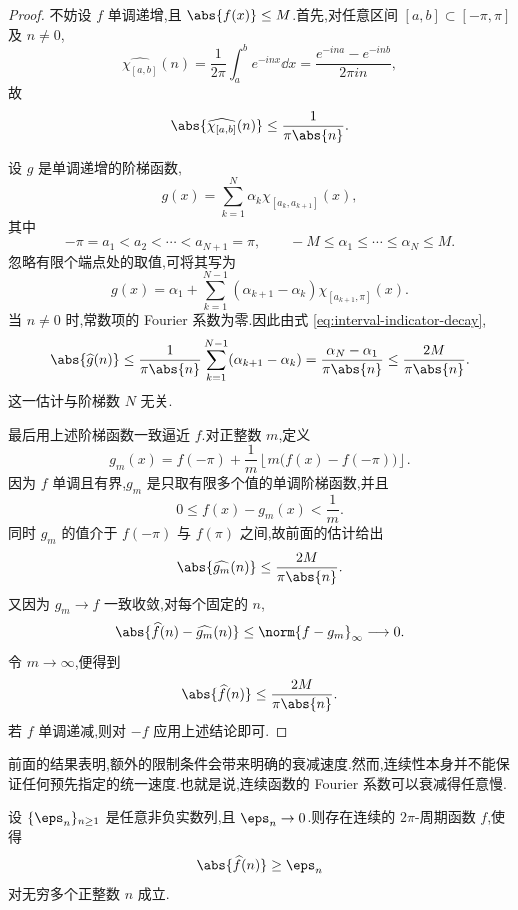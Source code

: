 \begin{proof}
不妨设 $f$ 单调递增,且 $\abs{f(x)}\leq M$.首先,对任意区间 $[a,b]\subset[-\pi,\pi]$ 及 $n\neq0$,
\[
\widehat{\chi_{[a,b]}}(n)
=\frac1{2\pi}\int_a^b e^{-inx}\dd x
=\frac{e^{-ina}-e^{-inb}}{2\pi in},
\]
故
\begin{equation}\label{eq:interval-indicator-decay}
\abs{\widehat{\chi_{[a,b]}}(n)}
\leq\frac1{\pi\abs{n}}.
\end{equation}

设 $g$ 是单调递增的阶梯函数,
\[
g(x)=\sum_{k=1}^{N}\alpha_k\chi_{[a_k,a_{k+1}]}(x),
\]
其中
\[
-\pi=a_1<a_2<\cdots<a_{N+1}=\pi,
\qquad
-M\leq\alpha_1\leq\cdots\leq\alpha_N\leq M.
\]
忽略有限个端点处的取值,可将其写为
\[
g(x)=\alpha_1+
\sum_{k=1}^{N-1}(\alpha_{k+1}-\alpha_k)
\chi_{[a_{k+1},\pi]}(x).
\]
当 $n\neq0$ 时,常数项的 Fourier 系数为零.因此由式 \eqref{eq:interval-indicator-decay},
\[\abs{\widehat g(n)}
\leq\frac1{\pi\abs{n}}
\sum_{k=1}^{N-1}(\alpha_{k+1}-\alpha_k)=\frac{\alpha_N-\alpha_1}{\pi\abs{n}}
\leq\frac{2M}{\pi\abs{n}}.\]
这一估计与阶梯数 $N$ 无关.

最后用上述阶梯函数一致逼近 $f$.对正整数 $m$,定义
\[
g_m(x)=f(-\pi)+\frac1m
\left\lfloor m\bigl(f(x)-f(-\pi)\bigr)\right\rfloor.
\]
因为 $f$ 单调且有界,$g_m$ 是只取有限多个值的单调阶梯函数,并且
\[
0\leq f(x)-g_m(x)<\frac1m.
\]
同时 $g_m$ 的值介于 $f(-\pi)$ 与 $f(\pi)$ 之间,故前面的估计给出
\[
\abs{\widehat{g_m}(n)}\leq\frac{2M}{\pi\abs{n}}.
\]
又因为 $g_m\to f$ 一致收敛,对每个固定的 $n$,
\[
\abs{\widehat f(n)-\widehat{g_m}(n)}
\leq\norm{f-g_m}_{\infty}\longrightarrow0.
\]
令 $m\to\infty$,便得到
\[
\abs{\widehat f(n)}\leq\frac{2M}{\pi\abs{n}}.
\]
若 $f$ 单调递减,则对 $-f$ 应用上述结论即可.
\end{proof}



前面的结果表明,额外的限制条件会带来明确的衰减速度.然而,连续性本身并不能保证任何预先指定的统一速度.也就是说,连续函数的 Fourier 系数可以衰减得任意慢.

\begin{proposition}
设 $\{\eps_n\}_{n\geq1}$ 是任意非负实数列,且 $\eps_n\to0$.则存在连续的 $2\pi$-周期函数 $f$,使得
\[
\abs{\widehat f(n)}\geq\eps_n
\]
对无穷多个正整数 $n$ 成立.
\end{proposition}

